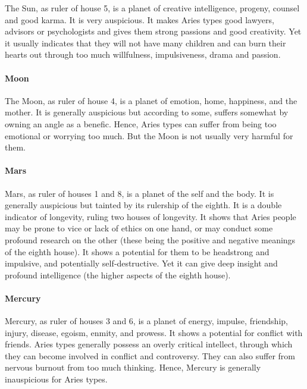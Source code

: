 The Sun, as ruler of house 5, is a planet of creative intelligence, progeny, counsel and good karma. It is very auspicious. It makes Aries types good lawyers, advisors or psychologists and gives them strong passions and good creativity. Yet it usually indicates that they will not have many children and can burn their hearts out through too much willfulness, impulsiveness, drama and passion.

 

\paragraph{Moon}

The Moon, as ruler of house 4, is a planet of emotion, home, happiness, and the mother. It is generally auspicious but according to some, suffers somewhat by owning an angle as a benefic. Hence, Aries types can suffer from being too emotional or worrying too much. But the Moon is not usually very harmful for them.

 

\paragraph{Mars}

Mars, as ruler of houses 1 and 8, is a planet of the self and the body. It is generally auspicious but tainted by its rulership of the eighth. It is a double indicator of longevity, ruling two houses of longevity. It shows that Aries people may be prone to vice or lack of ethics on one hand, or may conduct some profound research on the other (these being the positive and negative meanings of the eighth house). It shows a potential for them to be headstrong and impulsive, and potentially self‑destructive. Yet it can give deep insight and profound intelligence (the higher aspects of the eighth house).

 

\paragraph{Mercury}

Mercury, as ruler of houses 3 and 6, is a planet of energy, impulse, friendship, injury, disease, egoism, enmity, and prowess. It shows a potential for conflict with friends. Aries types generally possess an overly critical intellect, through which they can become involved in conflict and controversy. They can also suffer from nervous burnout from too much thinking. Hence, Mercury is generally inauspicious for Aries types.

